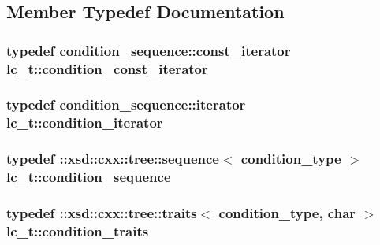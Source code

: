 \subsection{Member Typedef Documentation}
\hypertarget{classlc__t_a8cd4fbfb140695f669c9ce89e8755f50}{
\subsubsection[{condition\-\_\-const\-\_\-iterator}]{\setlength{\rightskip}{0pt plus 5cm}typedef condition\-\_\-sequence\-::const\-\_\-iterator {\bf lc\-\_\-t\-::condition\-\_\-const\-\_\-iterator}}}\label{classlc__t_a8cd4fbfb140695f669c9ce89e8755f50}
\hypertarget{classlc__t_a2cd4737a0b7e2c244e6ec8ab87d99c1f}{
\subsubsection[{condition\-\_\-iterator}]{\setlength{\rightskip}{0pt plus 5cm}typedef condition\-\_\-sequence\-::iterator {\bf lc\-\_\-t\-::condition\-\_\-iterator}}}\label{classlc__t_a2cd4737a0b7e2c244e6ec8ab87d99c1f}
\hypertarget{classlc__t_a0ee6b40c23baf2237388873de0c9df3f}{
\subsubsection[{condition\-\_\-sequence}]{\setlength{\rightskip}{0pt plus 5cm}typedef \-::xsd\-::cxx\-::tree\-::sequence$<$ {\bf condition\-\_\-type} $>$ {\bf lc\-\_\-t\-::condition\-\_\-sequence}}}\label{classlc__t_a0ee6b40c23baf2237388873de0c9df3f}
\hypertarget{classlc__t_a484a730347d961f1270bdd8d61bbcda2}{
\subsubsection[{condition\-\_\-traits}]{\setlength{\rightskip}{0pt plus 5cm}typedef \-::xsd\-::cxx\-::tree\-::traits$<$ {\bf condition\-\_\-type}, char $>$ {\bf lc\-\_\-t\-::condition\-\_\-traits}}}\label{classlc__t_a484a730347d961f1270bdd8d61bbcda2}
